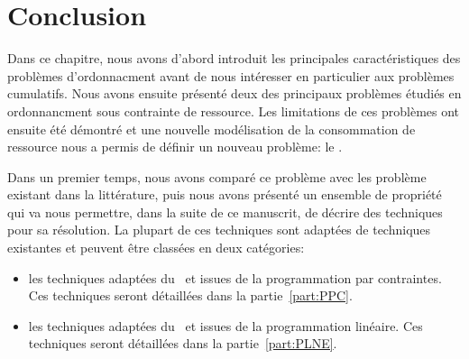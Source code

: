 
\section{Conclusion}

Dans ce chapitre, nous avons d'abord introduit les principales
caractéristiques des problèmes d'ordonnacment avant de nous intéresser
en particulier aux problèmes cumulatifs. Nous avons ensuite présenté
deux des principaux problèmes étudiés en ordonnancment sous
contrainte de ressource. Les limitations de ces problèmes ont ensuite
été démontré et une nouvelle modélisation de la consommation de
ressource nous a permis de définir un nouveau problème: le
\CECSP. 

Dans un premier temps, nous avons comparé ce problème avec les
problème existant dans la littérature, puis nous avons présenté un
ensemble de propriété qui va nous permettre, dans la suite de ce
manuscrit, de décrire des techniques pour sa résolution. La plupart de
ces techniques sont adaptées de techniques existantes et peuvent être
classées en deux catégories: 
\begin{itemize}
\item les techniques adaptées du \CUSP~et issues de la programmation
par contraintes. Ces techniques seront détaillées dans la
partie~\ref{part:PPC}.
\item les techniques adaptées du \RCPSP~et issues de la programmation
linéaire. Ces techniques seront détaillées dans la
partie~\ref{part:PLNE}.
\end{itemize}